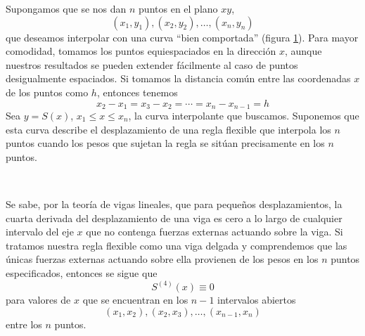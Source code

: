 Supongamos que se nos dan $n$ puntos en el plano $xy$,
$$(x_1, y_1), (x_2, y_2), \dots, (x_n, y_n)$$
que deseamos interpolar con una curva “bien comportada” (figura \ref{fig:bienc}). Para mayor comodidad, tomamos los puntos equiespaciados en la dirección $x$, aunque nuestros resultados se pueden extender fácilmente al caso de puntos desigualmente espaciados. Si tomamos la distancia común entre las coordenadas $x$ de los puntos como $h$, entonces tenemos
$$x_2-x_1=x_3-x_2=\cdots=x_n-x_{n-1}=h$$
Sea $y = S(x)$, $x_1 \leq x \leq x_n$, la curva interpolante que buscamos. Suponemos que esta curva describe el desplazamiento de una regla flexible que interpola los $n$ puntos cuando los pesos que sujetan la regla se sitúan precisamente en los $n$ puntos.
\begin{figure}[h!]
    \centering
    \caption{~}
    \label{fig:bienc}
\end{figure}

Se sabe, por la teoría de vigas lineales, que para pequeños desplazamientos, la cuarta derivada del desplazamiento de una viga es cero a lo largo de cualquier intervalo del eje $x$ que no contenga fuerzas externas actuando sobre la viga. Si tratamos nuestra regla flexible como una viga delgada y comprendemos que las únicas fuerzas externas actuando sobre ella provienen de los pesos en los $n$ puntos especificados, entonces se sigue que
$$S^{(4)}(x) \equiv 0$$
para valores de $x$ que se encuentran en los $n-1$ intervalos abiertos
$$(x_1, x_2), (x_2, x_3), \dots , (x_{n-1}, x_n)$$
entre los $n$ puntos.

